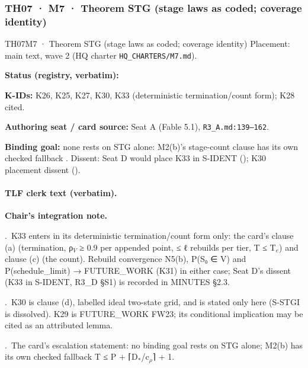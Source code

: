 \subsubsection{TH07 · M7 · Theorem STG (stage laws as coded; coverage identity)}\label{sec:th07}
\begin{card}{TH07}{M7 · Theorem STG (stage laws as coded; coverage identity)}
\approvedFB\quad Placement: main text, wave 2 (HQ charter \texttt{HQ\_CHARTERS/M7.md}).\par
\textbf{Status (registry, verbatim):} \par
\textbf{K-IDs:} K26, K25, K27, K30, K33 (deterministic termination/count form); K28 cited.\par
\textbf{Authoring seat / card source:} Seat A (Fable 5.1), \texttt{R3\_A.md:139–162}.\par
\textbf{Binding goal:} none rests on STG alone: M2(b)'s stage-count clause has its own checked fallback . Dissent: Seat D would place K33 in S-IDENT (); K30 placement dissent ().
\end{card}

\paragraph{TLF clerk text (verbatim).}
\par\noindent \textbf{Chair's integration note.}
\par{}.~K33 enters in its deterministic termination/count form only: the card's clause (a) (termination, ρ$_{V}$ ≥ 0.9 per appended point, ≤ ℓ rebuilds per tier, T ≤ T$_{e}$) and clause (c) (the count). Rebuild convergence N5(b), P(S₀ ∈ V) and P(schedule\_limit) → FUTURE\_WORK (K31) in either case; Seat D's dissent (K33 in S-IDENT, R3\_D §S1) is recorded in MINUTES §2.3.
\par{}.~K30 is clause (d), labelled ideal two-state grid, and is stated only here (S-STGI is dissolved). K29 is FUTURE\_WORK FW23; its conditional implication may be cited as an attributed lemma.
\par{}.~The card's escalation statement: no binding goal rests on STG alone; M2(b) has its own checked fallback T ≤ P + ⌈D$_{*}$/c$_{ρ}$⌉ + 1.

